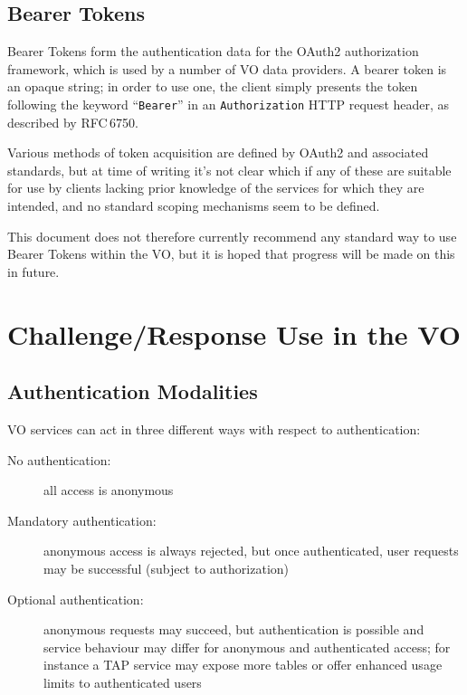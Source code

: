 \documentclass[11pt,a4paper]{ivoa}
\newcommand{\rfc}[1]{RFC\,#1}
\newcommand{\header}[1]{{\tt #1}}
\begin{document}


\subsection{Bearer Tokens}

Bearer Tokens form the authentication data for
the OAuth2 authorization framework,
which is used by a number of VO data providers.
A bearer token is an opaque string;
in order to use one, the client simply presents the token
following the keyword ``{\tt Bearer}''
in an \header{Authorization} HTTP request header,
as described by \rfc{6750}.

Various methods of token acquisition are defined by OAuth2 and
associated standards, but at time of writing it's not clear which if
any of these are suitable for use by clients lacking prior knowledge
of the services for which they are intended,
and no standard scoping mechanisms seem to be defined.

This document does not therefore currently recommend any standard way
to use Bearer Tokens within the VO, but it is hoped that
progress will be made on this in future.



\section{Challenge/Response Use in the VO}

\subsection{Authentication Modalities}
\label{sec:modalities}

VO services can act in three different ways with respect to authentication:
\begin{description}
  \item[No authentication:]
       all access is anonymous
  \item[Mandatory authentication:]
       anonymous access is always rejected, but once authenticated,
       user requests may be successful (subject to authorization)
  \item[Optional authentication:]
       anonymous requests may succeed, but authentication is possible
       and service behaviour may differ for anonymous and authenticated access;
       for instance a TAP service may expose more tables or offer enhanced
       usage limits to authenticated users
\end{description}
\end{document}
